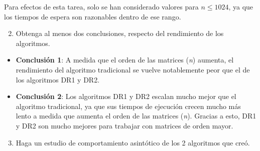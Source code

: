 \documentclass[12pt]{report}
\begin{document}
  Para efectos de esta tarea, solo se han considerado valores para $ n \leq 1024 $, ya que los tiempos de espera son razonables dentro de ese rango.
  
  \begin{enumerate}
    \setcounter{enumi}{1}
    \item Obtenga al menos dos conclusiones, respecto del rendimiento de los algoritmos.
  \end{enumerate}
  
  \begin{itemize}
    \item \textbf{Conclusión 1}: A medida que el orden de las matrices (\textit{n}) aumenta, el rendimiento del algoritmo tradicional se vuelve notablemente peor que el de los algoritmos DR1 y DR2.
    \item \textbf{Conclusión 2}: Los algoritmos DR1 y DR2 escalan mucho mejor que el algoritmo tradicional, ya que sus tiempos de ejecución crecen mucho más lento a medida que aumenta el orden de las matrices (\textit{n}). Gracias a esto, DR1 y DR2 son mucho mejores para trabajar con matrices de orden mayor.
  \end{itemize}
  
  \newpage
  
  \begin{enumerate}
    \setcounter{enumi}{2}
    \item Haga un estudio de comportamiento asintótico de los 2 algoritmos que creó.
  \end{enumerate}

  \centering
  
\end{document}
